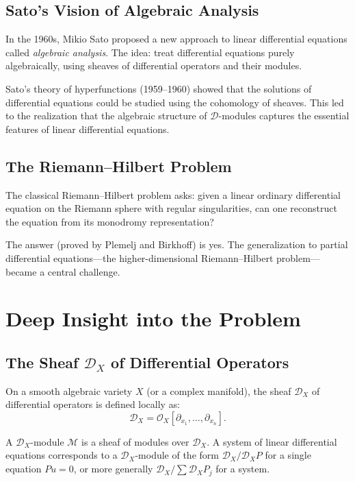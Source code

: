 \subsection{Sato's Vision of Algebraic Analysis}

In the 1960s, Mikio Sato proposed a new approach to linear differential equations called \emph{algebraic analysis}. The idea: treat differential equations purely algebraically, using sheaves of differential operators and their modules.

Sato's theory of hyperfunctions (1959--1960) showed that the solutions of differential equations could be studied using the cohomology of sheaves. This led to the realization that the algebraic structure of $\mathcal{D}$-modules captures the essential features of linear differential equations.

\subsection{The Riemann--Hilbert Problem}

The classical Riemann--Hilbert problem asks: given a linear ordinary differential equation on the Riemann sphere with regular singularities, can one reconstruct the equation from its monodromy representation?

The answer (proved by Plemelj and Birkhoff) is yes. The generalization to partial differential equations---the higher-dimensional Riemann--Hilbert problem---became a central challenge.

\section{Deep Insight into the Problem}

\subsection{The Sheaf $\mathcal{D}_X$ of Differential Operators}

On a smooth algebraic variety $X$ (or a complex manifold), the sheaf $\mathcal{D}_X$ of differential operators is defined locally as:
\[
\mathcal{D}_X = \mathcal{O}_X[\partial_{x_1}, \ldots, \partial_{x_n}].
\]

A $\mathcal{D}_X$-module $\mathcal{M}$ is a sheaf of modules over $\mathcal{D}_X$. A system of linear differential equations corresponds to a $\mathcal{D}_X$-module of the form $\mathcal{D}_X / \mathcal{D}_X P$ for a single equation $Pu = 0$, or more generally $\mathcal{D}_X / \sum \mathcal{D}_X P_j$ for a system.

